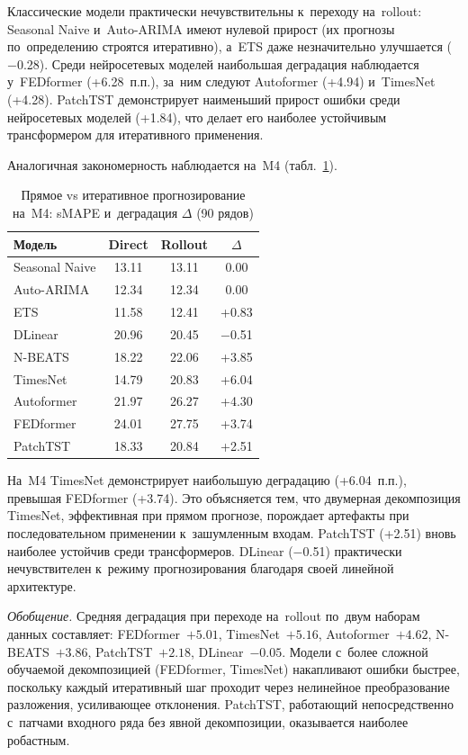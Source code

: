 Классические модели практически нечувствительны к~переходу на~rollout:
Seasonal Naive и~Auto-ARIMA имеют нулевой прирост (их прогнозы
по~определению строятся итеративно), а~ETS даже незначительно
улучшается ($-$0.28). Среди нейросетевых моделей наибольшая
деградация наблюдается у~FEDformer (+6.28~п.п.), за~ним следуют
Autoformer (+4.94) и~TimesNet (+4.28). PatchTST демонстрирует
наименьший прирост ошибки среди нейросетевых моделей (+1.84),
что делает его наиболее устойчивым трансформером для итеративного
применения.

Аналогичная закономерность наблюдается на~M4 (табл.~\ref{tab:rollout-m4}).

\begin{table}[H]
\centering
\caption{Прямое vs итеративное прогнозирование на~M4: sMAPE и~деградация $\Delta$ (90 рядов)}
\label{tab:rollout-m4}
\small
\begin{tabular}{@{}lccc@{}}
\toprule
Модель & Direct & Rollout & $\Delta$ \\
\midrule
Seasonal Naive & 13.11 & 13.11 & 0.00 \\
Auto-ARIMA     & 12.34 & 12.34 & 0.00 \\
ETS            & 11.58 & 12.41 & +0.83 \\
\midrule
DLinear        & 20.96 & 20.45 & $-$0.51 \\
N-BEATS        & 18.22 & 22.06 & +3.85 \\
TimesNet       & 14.79 & 20.83 & +6.04 \\
\midrule
Autoformer     & 21.97 & 26.27 & +4.30 \\
FEDformer      & 24.01 & 27.75 & +3.74 \\
PatchTST       & 18.33 & 20.84 & +2.51 \\
\bottomrule
\end{tabular}
\end{table}

На~M4 TimesNet демонстрирует наибольшую деградацию (+6.04~п.п.),
превышая FEDformer (+3.74). Это объясняется тем, что
двумерная декомпозиция TimesNet, эффективная при прямом прогнозе,
порождает артефакты при последовательном применении к~зашумленным
входам. PatchTST (+2.51) вновь наиболее устойчив среди трансформеров.
DLinear ($-$0.51) практически нечувствителен к~режиму прогнозирования
благодаря своей линейной архитектуре.

\textit{Обобщение.} Средняя деградация при переходе на~rollout
по~двум наборам данных составляет: FEDformer~$+5.01$, TimesNet~$+5.16$,
Autoformer~$+4.62$, N-BEATS~$+3.86$, PatchTST~$+2.18$, DLinear~$-0.05$.
Модели с~более сложной обучаемой декомпозицией (FEDformer, TimesNet)
накапливают ошибки быстрее, поскольку каждый итеративный шаг проходит
через нелинейное преобразование разложения, усиливающее отклонения.
PatchTST, работающий непосредственно с~патчами входного ряда без
явной декомпозиции, оказывается наиболее робастным.

